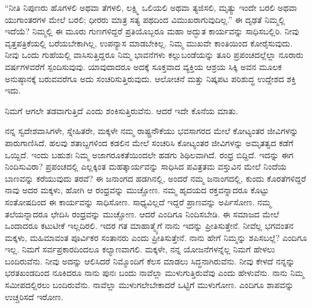 “ನೀತಿ ನಿಪುಣರು ಹೊಗಳಲಿ ಅಥವಾ ತೆಗಳಲಿ, ಲಕ್ಷ್ಮಿ ಒಲಿಯಲಿ ಅಥವಾ ತ್ಯಜಿಸಲಿ, ಮೃತ್ಯು ಇಂದೇ ಬರಲಿ ಅಥವಾ ಯುಗಾಂತರಗಳ ಮೇಲೆ ಬರಲಿ; ಧೀರರು ಮಾತ್ರ ಸತ್ಯ ಪಥದಿಂದ ವಿಮುಖರಾಗುವುದಿಲ್ಲ.” ಈ ದೃಢತೆ ನಿಮ್ಮಲ್ಲಿ ಇದೆಯೆ? ನಿಮ್ಮಲ್ಲಿ ಈ ಮೂರು ಗುಣಗಳಿದ್ದರೆ ಪ್ರತಿಯೊಬ್ಬರೂ ಮಹಾ ಅದ್ಭುತ ಕಾರ್ಯವನ್ನು ಸಾಧಿಸಬಲ್ಲಿರಿ. ನೀವು ವೃತ್ತಪತ್ರಿಕೆಯಲ್ಲಿ ಬರೆಯಬೇಕಾಗಿಲ್ಲ, ಉಪನ್ಯಾಸ ಮಾಡಬೇಕಿಲ್ಲ. ನಿಮ್ಮ ಮುಖವೇ ಕಾಂತಿಯಿಂದ ಕೋರೈಸುವುದು. ನೀವು ಒಂದು ಗುಹೆಯಲ್ಲಿ ವಾಸಿಸುತ್ತಿದ್ದರೂ ನಿಮ್ಮ ಭಾವನೆಗಳು ಕಲ್ಲುಬಂಡೆಯನ್ನು ತೂರಿ ಪ್ರಪಂಚದಲ್ಲೆಲ್ಲಾ ನೂರಾರು ವರ್ಷಗಳವರೆಗೆ ಸ್ಪಂದಿಸುವುವು. ಯಾವುದಾದರೂ ಅದಕ್ಕೆ ಸೂಕ್ತವಾದ ವ್ಯಕ್ತಿಯ ಆಶ್ರಯ ಸಿಕ್ಕಿ ಅವನ ಮೂಲಕ ಅನುಷ್ಠಾನಕ್ಕೆ ಬರುವವರೆಗೂ ಅದು ಸಂಚರಿಸುತ್ತಿರುವುದು. ಆಲೋಚನೆ ಮತ್ತು ನಿಷ್ಕಪಟ ಪರಿಶುದ್ಧ ಉದ್ದೇಶದ ಶಕ್ತಿ ಇದು.

ನಿಮಗೆ ಆಗಲೇ ತಡವಾಗುತ್ತಿದೆ ಎಂದು ಶಂಕಿಸುತ್ತಿರುವೆನು. ಆದರೆ ಇದೇ ಕೊನೆಯ ಮಾತು.

ನನ್ನ ಸ್ವದೇಶವಾಸಿಗಳೇ, ಸ್ನೇಹಿತರೇ, ಮಕ್ಕಳೇ ನಮ್ಮ ರಾಷ್ಟ್ರನೌಕೆಯು ಭವಸಾಗರದ ಮೇಲೆ ಕೋಟ್ಯಂತರ ಜೀವಿಗಳನ್ನು ಪಾರುಗಾಣಿಸಿದೆ. ಹಲವು ಶತಾಬ್ದಗಳಿಂದ ಕಡಲಿನ ಮೇಲೆ ಸಂಚರಿಸಿ ಕೋಟ್ಯಂತರ ಜೀವಿಗಳನ್ನು ಅಮೃತತ್ವದ ಕಡೆಗೆ ಒಯ್ದಿದೆ. ಇಂದು ಬಹುಶಃ ನಿಮ್ಮ ಅಜಾಗರೂಕತೆಯಿಂದಲೇ ಹಡಗು ಶಿಥಿಲವಾಗಿದೆ. ರಂಧ್ರ ಬಿದ್ದಿದೆ. ಇದನ್ನು ಈಗ ನಿಂದಿಸುವಿರಾ? ಪ್ರಪಂಚದಲ್ಲಿ ಎಲ್ಲಕ್ಕಿಂತ ಮಹತ್ಕಾರ್ಯವನ್ನು ಸಾಧಿಸಿದ ಪವಿತ್ರತಮ ವಸ್ತುವಿನ ಮೇಲೆ ನಿಂದೆಯ ಬಾಣವನ್ನು ಕರೆಯುವುದು ತರವೆ? ಈ ಜನಾಂಗದ ಹಡಗಿನಲ್ಲಿ, ಅಂದರೆ ನಮ್ಮ ಜನಾಂಗದಲ್ಲಿ, ಕುಂದು ಕೊರತೆಗಳಿದ್ದರೆ ನಾವು ಅದರ ಮಕ್ಕಳು, ಹೋಗಿ ಆ ರಂಧ್ರವನ್ನು ಮುಚ್ಚೋಣ. ನಮ್ಮ ಹೃದಯದ ರಕ್ತವನ್ನಾದರೂ ಕೊಟ್ಟು ಸಂತೋಷದಿಂದ ಈ ಕಾರ್ಯವನ್ನು ಸಾಧಿಸೋಣ. ಸಾಧ್ಯವಿಲ್ಲದೆ ಇದ್ದರೆ ಪ್ರಾಣವನ್ನು ಅರ್ಪಿಸೋಣ. ನಮ್ಮ ತಲೆಯನ್ನಾದರೂ ಛೇದಿಸಿ ರಂಧ್ರವನ್ನು ಮುಚ್ಚೋಣ. ಆದರೆ ಎಂದಿಗೂ ನಿಂದಿಸಬೇಡಿ. ಈ ಸಮಾಜದ ಮೇಲೆ ಒಂದಾದರೂ ಕಟುಟೀಕೆ ಇಲ್ಲದಿರಲಿ. ಇದರ ಗತ ಮಾಹಾತ್ಮ್ಯೆಗೆ ನಾನು ಇದನ್ನು ಪ್ರೀತಿಸುತ್ತೇನೆ. ನೀವೆಲ್ಲ ಭಗವಂತನ ಮಕ್ಕಳು, ಮಹಿಮಾವಂತ ಪೂರ್ವಿಕರ ಸಂತಾನರು ಎಂದು ಪ್ರೀತಿಸುತ್ತೇನೆ. ನಾನು ಹೇಗೆ ನಿಮ್ಮನ್ನು ಶಪಿಸಬಲ್ಲೆ? ಎಂದಿಗೂ ಇಲ್ಲ. ನಿಮಗೆ ಸರ್ವಪ್ರಕಾರದಿಂದಲೂ ಕಲ್ಯಾಣವಾಗಲಿ. ಮಕ್ಕಳೇ, ನನ್ನ ಯೋಜನೆಗಳನ್ನೆಲ್ಲ ನಿಮಗೆ ಹೇಳಲು ಬಂದಿರುವೆನು. ನೀವು ಅದನ್ನು ಆಲಿಸಿದರೆ ನಿಮ್ಮೊಂದಿಗೆ ಕೆಲಸ ಮಾಡಲು ಸಿದ್ಧನಾಗಿರುವೆನು. ನೀವು ಕೇಳದೆ ನನ್ನನ್ನು ಭರತಖಂಡದಿಂದ ನೂಕಿದರೂ ನಾನು ಪುನಃ ಬಂದು ನಾವೆಲ್ಲಾ ಮುಳುಗುತ್ತಿರುವೆವು ಎಂದು ಹೇಳುವೆನು. ನಾನು ನಿಮ್ಮ ಸಮೀಪದಲ್ಲಿರಲು ಬಂದಿರುವೆನು. ನಾವೆಲ್ಲಾ ಮುಳುಗಲೇಬೇಕಾದರೆ ಒಟ್ಟಿಗೆ ಮುಳುಗೋಣ. ಎಂದಿಗೂ ಶಾಪವನ್ನು ಉಚ್ಚರಿಸದೆ ಇರೋಣ.

